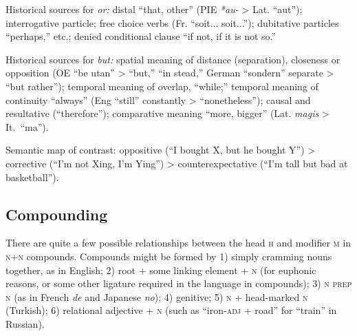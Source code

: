 \documentclass[11pt]{article}
\newcommand{\E}[1]{\textit{#1}}   %
\newcommand{\I}[1]{\textsc{#1}}   %
\begin{document}
Historical sources for \textit{or:} distal ``that, other'' (PIE
\textit{*au-} > Lat. ``aut''); interrogative particle; free choice
verbs (Fr. ``soit... soit...''); dubitative particles ``perhaps,''
etc.; denied conditional clause ``if not, if it is not so.''

Historical sources for \textit{but:} spatial meaning of distance
(separation), closeness or opposition (OE ``be utan'' > ``but,'' ``in
stead,'' German ``sondern'' separate > ``but rather''); temporal
meaning of overlap, ``while;'' temporal meaning of continuity
``always'' (Eng ``still'' constantly > ``nonetheless''); causal and
resultative (``therefore''); comparative meaning ``more, bigger''
(Lat. \textit{magis} > It.\ ``ma'').

Semantic map of contrast: oppositive (``I bought X, but he bought Y'')
> corrective (``I'm not Xing, I'm Ying'') > counterexpectative (``I'm
tall but bad at basketball'').

\subsection{Compounding}
There are quite a few possible relationships between the head \I{h}
and modifier \I{m} in \I{n+n} compounds.  Compounds might be formed by
1) simply cramming nouns together, as in English; 2) root + some
linking element + \I{n} (for euphonic reasons, or some other ligature
required in the language in compounds); 3) \I{n prep n} (as in French
\E{de} and Japanese \E{no}); 4) genitive; 5) \I{n} + head-marked \I{n}
(Turkish); 6) relational adjective + \I{n} (such as ``iron-\I{adj} +
road'' for ``train'' in Russian).
\end{document}

